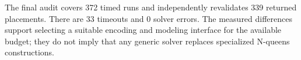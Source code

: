 The final audit covers 372 timed runs and independently revalidates 339 returned placements. There are 33 timeouts and 0 solver errors. The measured differences support selecting a suitable encoding and modeling interface for the available budget; they do not imply that any generic solver replaces specialized N-queens constructions.
